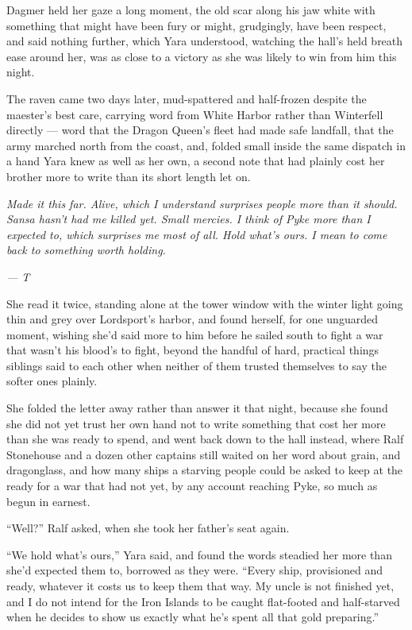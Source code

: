 Dagmer held her gaze a long moment, the old scar along his jaw white with something that might have been fury or might, grudgingly, have been respect, and said nothing further, which Yara understood, watching the hall’s held breath ease around her, was as close to a victory as she was likely to win from him this night.

\sceneBreak

The raven came two days later, mud-spattered and half-frozen despite the maester’s best care, carrying word from White Harbor rather than Winterfell directly — word that the Dragon Queen’s fleet had made safe landfall, that the army marched north from the coast, and, folded small inside the same dispatch in a hand Yara knew as well as her own, a second note that had plainly cost her brother more to write than its short length let on.

\textit{Made it this far. Alive, which I understand surprises people more than it should. Sansa hasn’t had me killed yet. Small mercies. I think of Pyke more than I expected to, which surprises me most of all. Hold what’s ours. I mean to come back to something worth holding.}

\textit{— T}

She read it twice, standing alone at the tower window with the winter light going thin and grey over Lordsport’s harbor, and found herself, for one unguarded moment, wishing she’d said more to him before he sailed south to fight a war that wasn’t his blood’s to fight, beyond the handful of hard, practical things siblings said to each other when neither of them trusted themselves to say the softer ones plainly.

She folded the letter away rather than answer it that night, because she found she did not yet trust her own hand not to write something that cost her more than she was ready to spend, and went back down to the hall instead, where Ralf Stonehouse and a dozen other captains still waited on her word about grain, and dragonglass, and how many ships a starving people could be asked to keep at the ready for a war that had not yet, by any account reaching Pyke, so much as begun in earnest.

“Well?” Ralf asked, when she took her father’s seat again.

“We hold what’s ours,” Yara said, and found the words steadied her more than she’d expected them to, borrowed as they were. “Every ship, provisioned and ready, whatever it costs us to keep them that way. My uncle is not finished yet, and I do not intend for the Iron Islands to be caught flat-footed and half-starved when he decides to show us exactly what he’s spent all that gold preparing.”